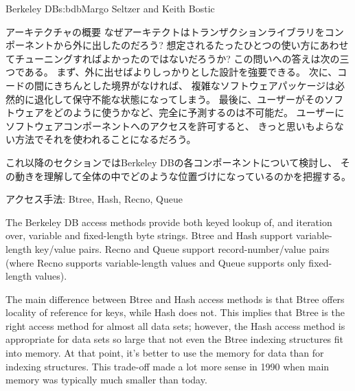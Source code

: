 \begin{aosachapter}{Berkeley DB}{s:bdb}{Margo Seltzer and Keith Bostic}
\begin{aosasect1}{アーキテクチャの概要}
なぜアーキテクトはトランザクションライブラリをコンポーネントから外に出したのだろう?
想定されるたったひとつの使い方にあわせてチューニングすればよかったのではないだろうか?
この問いへの答えは次の三つである。
まず、外に出せばよりしっかりとした設計を強要できる。
次に、コードの間にきちんとした境界がなければ、
複雑なソフトウェアパッケージは必然的に退化して保守不能な状態になってしまう。
最後に、ユーザーがそのソフトウェアをどのように使うかなど、完全に予測するのは不可能だ。
ユーザーにソフトウェアコンポーネントへのアクセスを許可すると、
きっと思いもよらない方法でそれを使われることになるだろう。

これ以降のセクションではBerkeley DBの各コンポーネントについて検討し、
その動きを理解して全体の中でどのような位置づけになっているのかを把握する。

\end{aosasect1}

\begin{aosasect1}{アクセス手法: Btree, Hash, Recno, Queue}

The Berkeley DB access methods provide both keyed lookup of, and
iteration over, variable and fixed-length byte strings.  Btree and
Hash support variable-length key/value pairs. Recno and Queue support
record-number/value pairs (where Recno supports variable-length values
and Queue supports only fixed-length values).

\pagebreak

The main difference between Btree and Hash access methods is that
Btree offers locality of reference for keys, while Hash does not. This
implies that Btree is the right access method for almost all data sets;
however, the Hash access method is appropriate for data sets so large
that not even the Btree indexing structures fit into memory. At that
point, it's better to use the memory for data than for indexing
structures. This trade-off made a lot more sense in 1990 when main
memory was typically much smaller than today.


\end{aosasect1}
\end{aosachapter}
